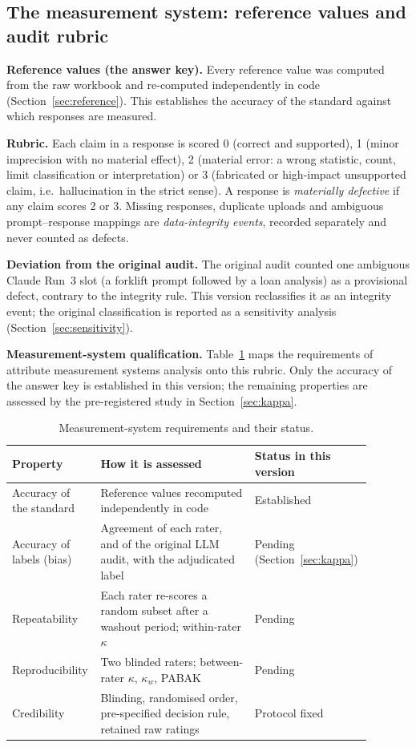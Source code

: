 \documentclass[11pt]{article}
\begin{document}
\subsection{The measurement system: reference values and audit rubric}\label{sec:rubric}
\textbf{Reference values (the answer key).} Every reference value was computed from the raw workbook and re-computed independently in code (Section~\ref{sec:reference}). This establishes the accuracy of the standard against which responses are measured.

\textbf{Rubric.} Each claim in a response is scored 0 (correct and supported), 1 (minor imprecision with no material effect), 2 (material error: a wrong statistic, count, limit classification or interpretation) or 3 (fabricated or high-impact unsupported claim, i.e.\ hallucination in the strict sense). A response is \emph{materially defective} if any claim scores 2 or 3. Missing responses, duplicate uploads and ambiguous prompt--response mappings are \emph{data-integrity events}, recorded separately and never counted as defects.

\textbf{Deviation from the original audit.} The original audit counted one ambiguous Claude Run~3 slot (a forklift prompt followed by a loan analysis) as a provisional defect, contrary to the integrity rule. This version reclassifies it as an integrity event; the original classification is reported as a sensitivity analysis (Section~\ref{sec:sensitivity}).

\textbf{Measurement-system qualification.} Table~\ref{tab:msa} maps the requirements of attribute measurement systems analysis onto this rubric. Only the accuracy of the answer key is established in this version; the remaining properties are assessed by the pre-registered study in Section~\ref{sec:kappa}.

\begin{table}[!htbp]
\centering\small
\caption{Measurement-system requirements and their status.}\label{tab:msa}
\begin{tabular}{@{}p{0.17\linewidth} p{0.42\linewidth} p{0.3\linewidth}@{}}
\toprule
Property & How it is assessed & Status in this version \\
\midrule
Accuracy of the standard & Reference values recomputed independently in code & Established \\
Accuracy of labels (bias) & Agreement of each rater, and of the original LLM audit, with the adjudicated label & Pending (Section~\ref{sec:kappa}) \\
Repeatability & Each rater re-scores a random subset after a washout period; within-rater $\kappa$ & Pending \\
Reproducibility & Two blinded raters; between-rater $\kappa$, $\kappa_w$, PABAK & Pending \\
Credibility & Blinding, randomised order, pre-specified decision rule, retained raw ratings & Protocol fixed \\
\bottomrule
\end{tabular}
\end{table}
\end{document}
